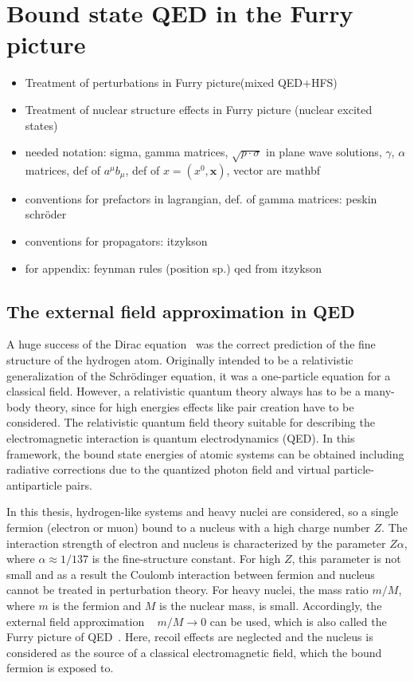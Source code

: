 \chapter{Bound state QED in the Furry picture}
\label{ch:furry_pic}
\begin{itemize}
\item Treatment of perturbations in Furry picture(mixed QED+HFS)
\item Treatment of nuclear structure effects in Furry picture (nuclear excited states)
\item needed notation: sigma, gamma matrices, $\sqrt{p\cdot \sigma}$ in plane wave solutions, $\gamma$, $\alpha$ matrices, def of $a^\mu b_\mu$, def of $x=(x^0,\mathbf{x})$, vector are mathbf

\item conventions for prefactors in lagrangian, def. of gamma matrices: peskin schröder
\item conventions for propagators: itzykson
\item for appendix:  feynman rules (position sp.) qed from itzykson
\end{itemize} 
\section{The external field approximation in QED}
\label{sec:ext_field}
A huge success of the Dirac equation~\cite{dirac1928} was the correct prediction of the fine structure of the hydrogen atom. Originally intended to be a relativistic generalization of the Schrödinger equation, it was a one-particle equation for a classical field. 
However, a relativistic quantum theory always has to be a many-body theory, since for high energies effects like pair creation have to be considered. The relativistic quantum field theory suitable for describing the electromagnetic interaction is quantum electrodynamics (QED). In this framework, the bound state energies of atomic systems can be obtained including radiative corrections due to the quantized photon field and virtual particle-antiparticle pairs. 

In this thesis, hydrogen-like systems and heavy nuclei are considered, so a single fermion (electron or muon) bound to a nucleus with a high charge number $Z$. The interaction strength of electron and nucleus is characterized by the parameter $Z\alpha$, where $\alpha \approx 1/137$ is the fine-structure constant. For high $Z$, this parameter is not small and as a result the Coulomb interaction between fermion and nucleus cannot be treated in perturbation theory. 
For heavy nuclei, the mass ratio $m/M$, where $m$ is the fermion and $M$ is the nuclear mass, is small. Accordingly, the external field approximation ~\cite[\mbox{Section~13.6}]{weinberg2005} $m/M \rightarrow 0$ can be used, which is also called the Furry picture of QED~\cite{furry1951}. Here, recoil effects are neglected and the nucleus is considered as the source of a classical electromagnetic field, which the bound fermion is exposed to.

